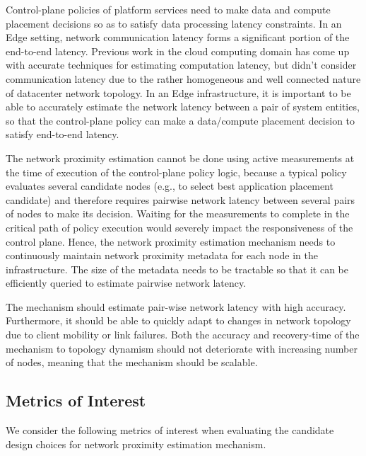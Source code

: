 Control-plane policies of platform services need to make data and compute placement decisions so as to satisfy data processing latency constraints. In an Edge setting, network communication latency forms a significant portion of the end-to-end latency. Previous work in the cloud computing domain has come up with accurate techniques for estimating computation latency, but didn't consider communication latency due to the rather homogeneous and well connected nature of datacenter network topology. In an Edge infrastructure, it is important to be able to accurately estimate the network latency between a pair of system entities, so that the control-plane policy can make a data/compute placement decision to satisfy end-to-end latency.
\par The network proximity estimation cannot be done using active measurements at the time of execution of the control-plane policy logic, because a typical policy evaluates several candidate nodes (e.g., to select best application placement candidate) and therefore  requires pairwise network latency between several pairs of nodes to make its decision. Waiting for the measurements to complete in the critical path of policy execution would severely impact the responsiveness of the control plane. Hence, the network proximity estimation mechanism needs to continuously maintain network proximity metadata for each node in the infrastructure. The size of the metadata needs to be tractable so that it can be efficiently queried to estimate pairwise network latency.
\par The mechanism should estimate pair-wise network latency with high accuracy. Furthermore, it should be able to quickly adapt to changes in network topology due to client mobility or link failures. Both the accuracy and recovery-time of the mechanism to topology dynamism should not deteriorate with increasing number of nodes, meaning that the mechanism should be scalable.

\subsection{Metrics of Interest}
We consider the following metrics of interest when evaluating the candidate design choices for network proximity estimation mechanism.

